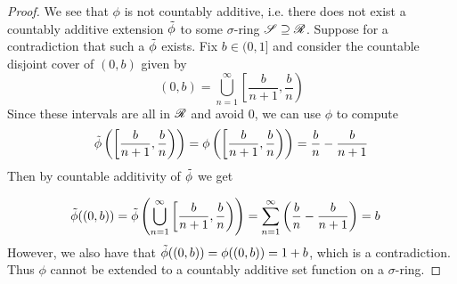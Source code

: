 \documentclass[11pt]{article}
\begin{document}
\begin{exercise}{11.15}
\begin{proof}
        We see that $\phi$ is not countably additive, i.e. there does not exist a countably additive extension $\Tilde{\phi}$ to some $\sigma$-ring $\mathscr{S} \supseteq \mathscr{R}$.  Suppose for a contradiction that such a $\Tilde{\phi}$ exists. Fix $b \in (0, 1]$ and consider the countable disjoint cover of $(0, b)$ given by $$(0, b) = \bigcup_{n = 1}^\infty \left[ \frac{b}{n + 1}, \frac{b}{n} \right)$$ Since these intervals are all in $\mathscr{R}$ and avoid $0$, we can use $\phi$ to compute $$\Tilde{\phi}\left(  \left[ \frac{b}{n + 1}, \frac{b}{n} \right) \right) = \phi \left(  \left[ \frac{b}{n + 1}, \frac{b}{n} \right) \right) = \frac{b}{n} - \frac{b}{n + 1}$$ Then by countable additivity of $\Tilde{\phi}$ we get 
        
        \begin{equation*}
            \begin{split}
                \Tilde{\phi} ((0, b)) = \Tilde{\phi}\left( \bigcup_{n = 1}^\infty \left[ \frac{b}{n + 1}, \frac{b}{n} \right) \right) & = \sum_{n = 1}^\infty \left( \frac{b}{n} - \frac{b}{n + 1} \right) = b
            \end{split}
        \end{equation*}
        However, we also have that $\Tilde{\phi}((0, b)) = \phi((0, b)) = 1 + b$, which is a contradiction. Thus $\phi$ cannot be extended to a countably additive set function on a $\sigma$-ring. 
    \end{proof}
\end{exercise}
\end{document}
